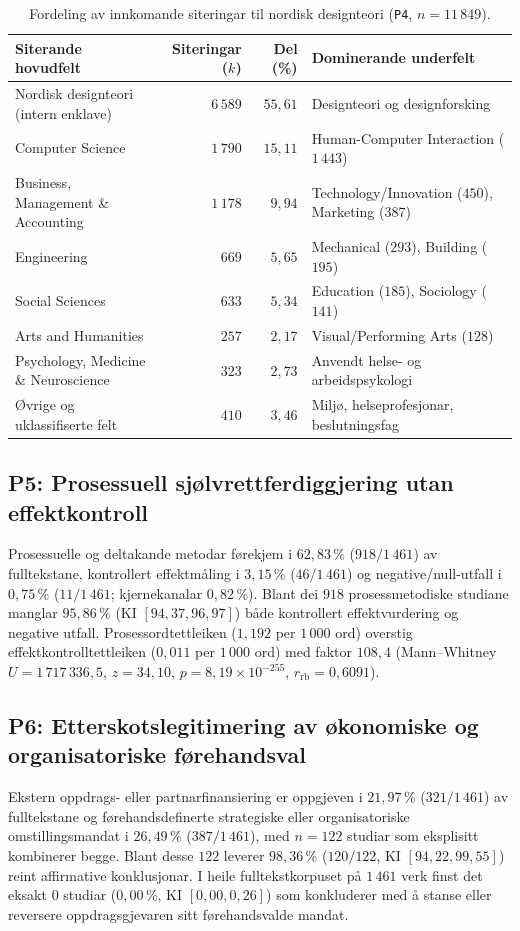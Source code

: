 \documentclass[11pt,a4paper]{article}
\begin{document}
\begin{table}[htbp]
\centering
\caption{Fordeling av innkomande siteringar til nordisk designteori (\texttt{P4}, $n = 11\,849$).}
\label{tab:eksport}
\footnotesize
\begin{tabular}{@{}lrrl@{}}
\toprule
\textbf{Siterande hovudfelt} & \textbf{Siteringar ($k$)} & \textbf{Del (\%)} & \textbf{Dominerande underfelt} \\
\midrule
Nordisk designteori (intern enklave) & $6\,589$ & $55{,}61$ & Designteori og designforsking \\
Computer Science & $1\,790$ & $15{,}11$ & Human-Computer Interaction ($1\,443$) \\
Business, Management \& Accounting & $1\,178$ & $9{,}94$ & Technology/Innovation ($450$), Marketing ($387$) \\
Engineering & $669$ & $5{,}65$ & Mechanical ($293$), Building ($195$) \\
Social Sciences & $633$ & $5{,}34$ & Education ($185$), Sociology ($141$) \\
Arts and Humanities & $257$ & $2{,}17$ & Visual/Performing Arts ($128$) \\
Psychology, Medicine \& Neuroscience & $323$ & $2{,}73$ & Anvendt helse- og arbeidspsykologi \\
Øvrige og uklassifiserte felt & $410$ & $3{,}46$ & Miljø, helseprofesjonar, beslutningsfag \\
\bottomrule
\end{tabular}
\end{table}

\subsection{P5: Prosessuell sjølvrettferdiggjering utan effektkontroll}
Prosessuelle og deltakande metodar førekjem i $62{,}83\,\%$ ($918/1\,461$) av fulltekstane, kontrollert effektmåling i $3{,}15\,\%$ ($46/1\,461$) og negative/null-utfall i $0{,}75\,\%$ ($11/1\,461$; kjernekanalar $0{,}82\,\%$). Blant dei $918$ prosessmetodiske studiane manglar $95{,}86\,\%$ (KI $[94{,}37, 96{,}97]$) både kontrollert effektvurdering og negative utfall. Prosessordtettleiken ($1{,}192$ per $1\,000$ ord) overstig effektkontrolltettleiken ($0{,}011$ per $1\,000$ ord) med faktor $108{,}4$ (Mann--Whitney $U = 1\,717\,336{,}5$, $z = 34{,}10$, $p = 8{,}19 \times 10^{-255}$, $r_{\mathrm{rb}} = 0{,}6091$).

\subsection{P6: Etterskotslegitimering av økonomiske og organisatoriske førehandsval}
Ekstern oppdrags- eller partnarfinansiering er oppgjeven i $21{,}97\,\%$ ($321/1\,461$) av fulltekstane og førehandsdefinerte strategiske eller organisatoriske omstillingsmandat i $26{,}49\,\%$ ($387/1\,461$), med $n = 122$ studiar som eksplisitt kombinerer begge. Blant desse $122$ leverer $98{,}36\,\%$ ($120/122$, KI $[94{,}22, 99{,}55]$) reint affirmative konklusjonar. I heile fulltekstkorpuset på $1\,461$ verk finst det eksakt $0$ studiar ($0{,}00\,\%$, KI $[0{,}00, 0{,}26]$) som konkluderer med å stanse eller reversere oppdragsgjevaren sitt førehandsvalde mandat.
\end{document}
